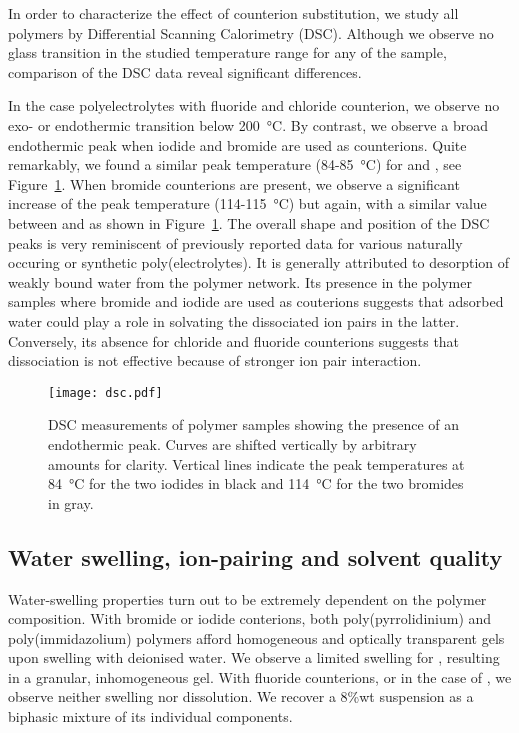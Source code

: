 \documentclass[journal=jacsat,manuscript=article]{achemso}
\begin{document}
In order to characterize the effect of counterion substitution, we study all polymers by Differential Scanning Calorimetry (DSC). Although we observe no glass transition in the studied temperature range for any of the sample, comparison of the DSC data reveal significant differences.

In the case polyelectrolytes with fluoride and chloride counterion, we observe no exo- or endothermic transition below \SI{200}{\celsius}. By contrast, we observe a broad endothermic peak when iodide and bromide are used as counterions. Quite remarkably, we found a similar peak temperature (84-\SI{85}{\celsius}) for  and , see Figure~\ref{fig:dsc}. When bromide counterions are present, we observe a significant increase of the peak temperature (114-\SI{115}{\celsius}) but again, with a similar value between  and  as shown in Figure~\ref{fig:dsc}. The overall shape and position of the DSC peaks is very reminiscent of previously reported data for various naturally occuring or synthetic poly(electrolytes)\cite{Li2005,Sarmento2006,Ostrowska-Czubenko2009a,Moin2015}. It is generally attributed to desorption of weakly bound water from the polymer network. Its presence in the polymer samples where bromide and iodide are used as couterions suggests that adsorbed water could play a role in solvating the dissociated ion pairs in the latter. Conversely, its absence for chloride and fluoride counterions suggests that dissociation is not effective because of stronger ion pair interaction.

\begin{figure}
\texttt{[image: dsc.pdf]}
\caption{DSC measurements of polymer samples showing the presence of an endothermic peak. Curves are shifted vertically by arbitrary amounts for clarity. Vertical lines indicate the peak temperatures at \SI{84}{\celsius} for the two iodides in black and \SI{114}{\celsius} for the two bromides in gray.}
\label{fig:dsc}
\end{figure}

\subsection{Water swelling, ion-pairing and solvent quality}
Water-swelling properties turn out to be extremely dependent on the polymer composition. With bromide or iodide conterions, both poly(pyrrolidinium) and poly(immidazolium) polymers afford homogeneous and optically transparent gels upon swelling with deionised water. We observe a limited swelling for , resulting in a granular, inhomogeneous gel. With fluoride counterions, or in the case of , we observe neither swelling nor dissolution. We recover a 8\%wt suspension as a biphasic mixture of its individual components.
\end{document}
